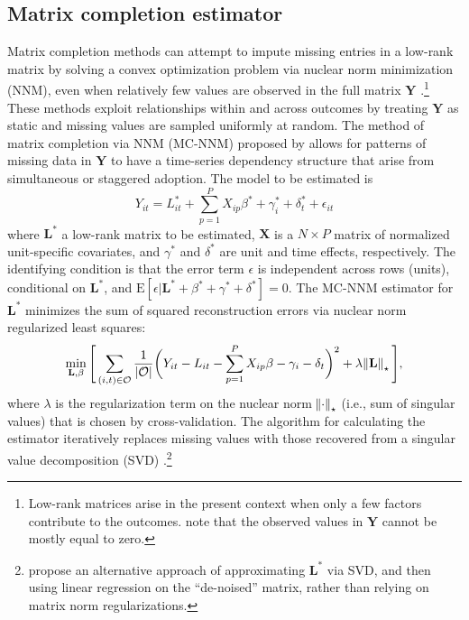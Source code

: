 \documentclass[12pt]{article}
\newcommand{\E}{\mathrm{E}}
\begin{document}
\subsection{Matrix completion estimator}

Matrix completion methods can attempt to impute missing entries in a low-rank matrix by solving a convex optimization problem via nuclear norm minimization (NNM), even when relatively few values are observed in the full matrix $\mathbf{Y}$ \citep[e.g.,][]{candes2009exact,candes2010matrix}.\footnote{Low-rank matrices arise in the present context when only a few factors contribute to the outcomes. \citet{candes2009exact} note that the observed values in $\mathbf{Y}$ cannot be mostly equal to zero.} These methods exploit relationships within and across outcomes by treating $\mathbf{Y}$ as static and missing values are sampled uniformly at random. The method of matrix completion via NNM (MC-NNM) proposed by \citet{athey2017matrix} allows for patterns of missing data in $\mathbf{Y}$ to have a time-series dependency structure that arise from simultaneous or staggered adoption. The model to be estimated is
%
\begin{equation}
Y_{it} = L_{it}^{*} + \sum_{p=1}^{P} X_{ip} \beta^{*} + \gamma_{i}^{*} + \delta_{t}^{*} + \epsilon_{it} \label{eq:mc-Y}
\end{equation}
%
where $\mathbf{L^{*}}$ a low-rank matrix to be estimated, $\mathbf{X}$ is a $N \times P$ matrix of normalized unit-specific covariates, and $\gamma^{*}$ and $\delta^{*}$ are unit and time effects, respectively. The identifying condition is that the error term $\epsilon$ is independent across rows (units), conditional on $\mathbf{L^{*}}$, and $\E[\epsilon | \mathbf{L^{*}} + \beta^{*} + \gamma^{*} + \delta^{*}] = 0$. The MC-NNM estimator for $\mathbf{L^{*}}$ minimizes the sum of squared reconstruction errors via nuclear norm regularized least squares:
%
\begin{equation}
\min_{\mathbf{L}, \beta} \Bigg[\sum_{(i,t) \in \mathcal{O}} \frac{1}{|\mathcal{O}|} \bigg(Y_{it} - L_{it} - \sum_{p=1}^{P} X_{ip} \beta - \gamma_{i} - \delta_{t} \bigg)^2 + \lambda \norm{\mathbf{L}}_\star \Bigg], \label{eq:mc-opt}
\end{equation}
%
where $\lambda$ is the regularization term on the nuclear norm $\norm{\cdot}_\star$ (i.e., sum of singular values) that is chosen by cross-validation. The algorithm for calculating the estimator iteratively replaces missing values with those recovered from a singular value decomposition (SVD) \citep{mazumder2010spectral}.\footnote{\citet{amjad2018robust} propose an alternative approach of approximating $\mathbf{L^{*}}$ via SVD, and then using linear regression on the ``de-noised'' matrix, rather than relying on matrix norm regularizations.} 
\end{document}
